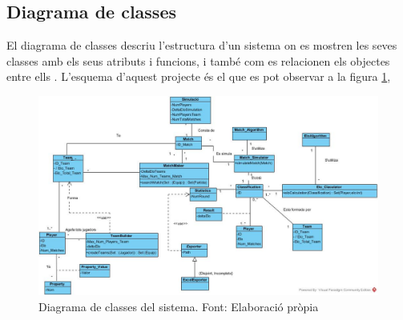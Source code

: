 \documentclass[a4paper]{article}
\begin{document}
\subsection{Diagrama de classes}
El diagrama de classes descriu l'estructura d'un sistema on es mostren les seves classes amb els seus atributs i funcions, i també com es relacionen els objectes entre ells \cite{wikipediaClassDiagram}. L'esquema d'aquest projecte és el que es pot observar a la figura \ref{fig:ClassDiagram},
\begin{landscape}

\newpage
\thispagestyle{lndscape}
    \begin{center}
        \begin{figure}[h!]
            \includegraphics[width=1.5 \textwidth]{images/Diagrama_Classes2.jpg}%
            \caption{Diagrama de classes del sistema. Font: Elaboració pròpia}
            \label{fig:ClassDiagram}
        \end{figure}
    \end{center}
\end{landscape}

\newpage
\end{document}
